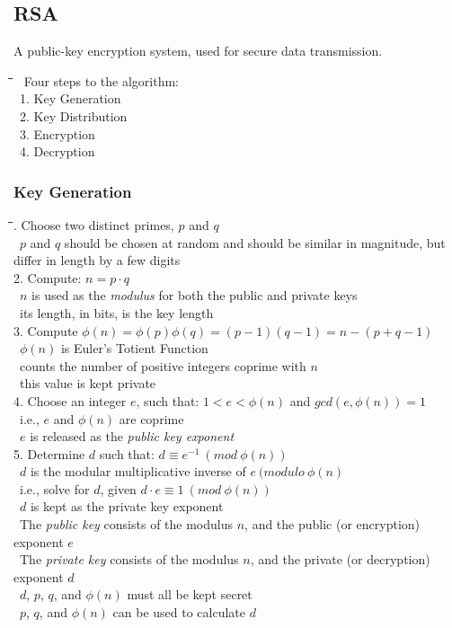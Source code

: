 \documentclass[10pt,letterpaper]{scrartcl}
\newcommand{\tbul}{\textbullet}
\newcommand{\tend}{\>\textendash}
\newcommand{\tasc}{\>\>\textasteriskcentered}
\newcommand{\tabDef}{\hspace{2em}\=\hspace{2em}\=\hspace{2em}\=\hspace{2em}\=\kill}
\begin{document}
\subsection{RSA}
A public-key encryption system, used for secure data transmission. 
\begin{tabbing}\tabDef
\tbul\ Four steps to the algorithm:\\
\>\ 1. Key Generation\\
\>\ 2. Key Distribution\\
\>\ 3. Encryption \\
\>\ 4. Decryption\end{tabbing}
\subsubsection{Key Generation}\begin{tabbing}\tabDef 
1. Choose two distinct primes, $p$ and $q$ \\
	\tend\ $p$ and $q$ should be chosen at random and should be similar in magnitude, but differ in length by a few digits \\
2. Compute: $\displaystyle n=p\cdot q$ \\
	\tend\ $n$ is used as the \textit{modulus} for both the public and private keys \\
	\tend\ its length, in bits, is the key length\\
3. Compute $\displaystyle \phi (n) = \phi (p)\phi (q) = (p-1)(q-1)=n -(p+q-1)$ \\
	\tend\ $\displaystyle \phi (n)$ is Euler's Totient Function \\
		\tasc\ counts the number of positive integers coprime with $n$\\
	\tend\ this value is kept private \\
4. Choose an integer $e$, such that: $1 < e < \phi (n)$ and $gcd(e, \phi (n))=1$\\
	\tend\ i.e., $e$ and $\phi (n)$ are coprime \\
    \tend\ $e$ is released as the \textit{public key exponent} \\
5. Determine $d$ such that: $\displaystyle d \equiv e^{-1} \ (mod \ \phi (n))$\\
	\tend\ $d$ is the modular multiplicative inverse of $e \ (modulo \ \phi (n)$\\
    \tend\ i.e., solve for $d$, given $d\cdot e \equiv 1 \ (mod \ \phi (n))$\\
    \tend\ $d$ is kept as the private key exponent \\
\tbul\ The \textit{public key} consists of the modulus $n$, and the public (or encryption) exponent $e$ \\
\tbul\ The \textit{private key} consists of the modulus $n$, and the private (or decryption) exponent $d$ \\
\tbul\ $d$, $p$, $q$, and $\phi (n)$ must all be kept secret \\
	\tend\ $p$, $q$, and $\phi (n)$ can be used to calculate $d$\end{tabbing}
\end{document}
